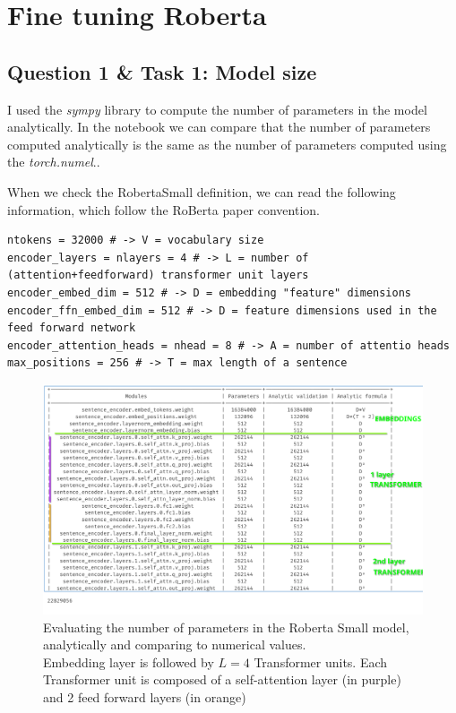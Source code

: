 \documentclass[a4paper]{article}
\begin{document}

\section{Fine tuning Roberta}
\subsection*{Question 1 \& Task 1: Model size}
I used the \textit{sympy} library to compute the number of parameters in the model analytically.
In the notebook we can compare that the number of parameters computed analytically is the same as the number of parameters computed using the \textit{torch.numel}..


When we check the RobertaSmall definition, we can read the following information, which follow the RoBerta paper convention.
\begin{verbatim}
ntokens = 32000 # -> V = vocabulary size
encoder_layers = nlayers = 4 # -> L = number of (attention+feedforward) transformer unit layers
encoder_embed_dim = 512 # -> D = embedding "feature" dimensions
encoder_ffn_embed_dim = 512 # -> D = feature dimensions used in the feed forward network
encoder_attention_heads = nhead = 8 # -> A = number of attentio heads
max_positions = 256 # -> T = max length of a sentence
\end{verbatim}


\begin{figure}[ht]
    \centering
    \includegraphics[width=.6\textwidth]{figures/roberta_params.png}
    \caption{Evaluating the number of parameters in the Roberta Small model, analytically and comparing to numerical values. \\ 
    Embedding layer is followed by $L=4$ Transformer units. Each Transformer unit is composed of a self-attention layer (in purple) and 2 feed forward layers (in orange)}
    \label{fig:roberta_params}
\end{figure}
\end{document}
